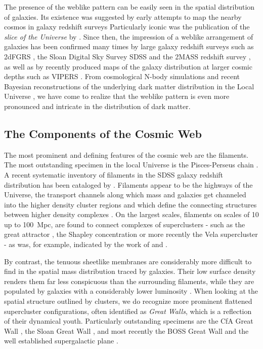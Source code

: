 The presence of the weblike pattern can be easily seen in the spatial distribution of galaxies. Its existence was  suggested 
by early attempts to map the nearby cosmos in galaxy redshift surveys \citep{Gregory1978,Geller1989,Shectman1996} 
Particularly iconic was the publication of the \emph{slice of the Universe} by \cite{Lapparent1986}. Since then, the impression 
of a weblike arrangement of galaxies has been confirmed many times by large galaxy redshift surveys such as 2dFGRS 
\citep{Colless2003,Weygaert2009}, the Sloan Digital Sky Survey SDSS \citep{Tegmark2003} and the 2MASS redshift survey \citep{Huchra2012}, 
as well as by recently produced maps of the galaxy distribution at larger cosmic depths such as VIPERS \citep{Vipers2014}. 
From cosmological N-body simulations \citep[e.g.][]{Springel2005c,Vogelsberger2014,Schaye2015} and recent Bayesian reconstructions of the 
underlying dark matter distribution in the Local Universe \citep{Hess2013,Kitaura2013}, we have 
come to realize that the weblike pattern is even more pronounced and intricate in the distribution of dark matter.

\subsection{The Components of the Cosmic Web}
The most prominent and defining features of the cosmic web are the filaments. The most outstanding specimen in the local Universe 
is the Pisces-Perseus chain \citep{Giovanelli1985}. A recent systematic inventory of filaments in the SDSS galaxy redshift 
distribution has been cataloged by \cite{Tempel2014} \cite[also see][]{Jones2010,Sousbie2011e}. Filaments appear to be the highways of the Universe, 
the transport channels along which mass and galaxies get channeled into the higher density cluster regions \citep{Haarlem1993} and 
which define the connecting structures between higher density complexes \citep{Bond1996,Colberg2005,Weygaert2009,Aragon-Calvo2010a}. On the largest 
scales, filaments on scales of 10 up to 100~Mpc, are found to connect complexes of superclusters - such as the great attractor 
\citep{1988ApJ...326...19L}, the Shapley concentration 
\citep{1930BHarO.874....9S,2006A&A...447..133P} or more recently the Vela supercluster \citep{2017MNRAS.466L..29K} - as was, for example, indicated by the work of \cite{2004ApJ...606...25B} and \cite{Libeskind2015}. 

By contrast, the tenuous sheetlike membranes are considerably more difficult to find in the spatial mass distribution traced by 
galaxies. Their low surface density renders them far less conspicuous than the surrounding filaments, while they are populated 
by galaxies with a considerably lower luminosity \citep[see e.g.][]{Cautun2014a}. When looking at the spatial structure outlined by 
clusters, we do recognize more prominent flattened supercluster configurations, often identified as \emph{Great Walls}, which 
is a reflection of their dynamical youth. Particularly outstanding specimens are the 
CfA Great Wall \citep{Geller1989}, the Sloan Great Wall \citep{2005ApJ...624..463G}, and most recently the BOSS 
Great Wall \citep{2016A&A...588L...4L} and the well established supergalactic plane \citep{1953AJ.....58...30D,2000MNRAS.312..166L}. 


